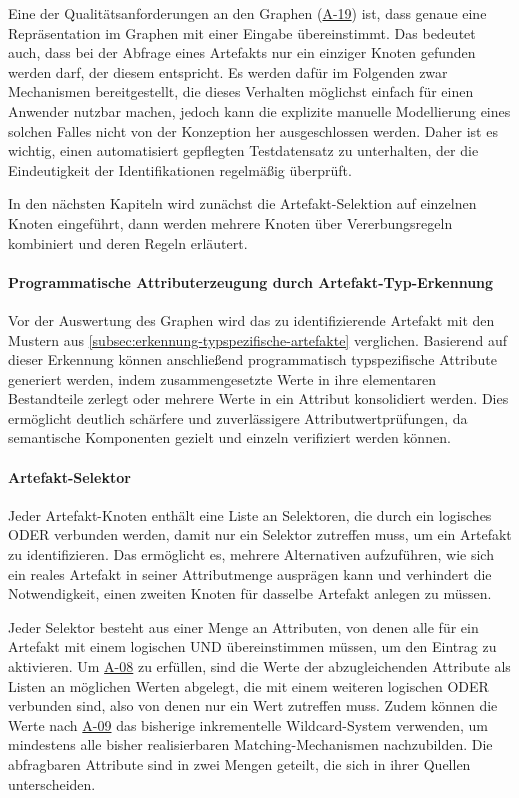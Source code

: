 Eine der Qualitätsanforderungen an den Graphen (\hyperref[subsec:req-graph-inner-consistency]{A-19}) ist, dass genaue eine Repräsentation im Graphen mit einer Eingabe übereinstimmt.
Das bedeutet auch, dass bei der Abfrage eines Artefakts nur ein einziger Knoten gefunden werden darf, der diesem entspricht.
Es werden dafür im Folgenden zwar Mechanismen bereitgestellt, die dieses Verhalten möglichst einfach für einen Anwender nutzbar machen, jedoch kann die explizite manuelle Modellierung eines solchen Falles nicht von der Konzeption her ausgeschlossen werden.
Daher ist es wichtig, einen automatisiert gepflegten Testdatensatz zu unterhalten, der die Eindeutigkeit der Identifikationen regelmäßig überprüft.

In den nächsten Kapiteln wird zunächst die Artefakt-Selektion auf einzelnen Knoten eingeführt, dann werden mehrere Knoten über Vererbungsregeln kombiniert und deren Regeln erläutert.

\paragraph{Programmatische Attributerzeugung durch Artefakt-Typ-Erkennung}

Vor der Auswertung des Graphen wird das zu identifizierende Artefakt mit den Mustern aus \autoref{subsec:erkennung-typspezifische-artefakte} verglichen.
Basierend auf dieser Erkennung können anschließend programmatisch typspezifische Attribute generiert werden, indem zusammengesetzte Werte in ihre elementaren Bestandteile zerlegt oder mehrere Werte in ein Attribut konsolidiert werden.
Dies ermöglicht deutlich schärfere und zuverlässigere Attributwertprüfungen, da semantische Komponenten gezielt und einzeln verifiziert werden können.

\paragraph{Artefakt-Selektor}

Jeder Artefakt-Knoten enthält eine Liste an Selektoren, die durch ein logisches ODER verbunden werden, damit nur ein Selektor zutreffen muss, um ein Artefakt zu identifizieren.
Das ermöglicht es, mehrere Alternativen aufzuführen, wie sich ein reales Artefakt in seiner Attributmenge ausprägen kann und verhindert die Notwendigkeit, einen zweiten Knoten für dasselbe Artefakt anlegen zu müssen.

Jeder Selektor besteht aus einer Menge an Attributen, von denen alle für ein Artefakt mit einem logischen UND übereinstimmen müssen, um den Eintrag zu aktivieren.
Um \hyperref[subsec:req-multiple-attribute-values]{A-08} zu erfüllen, sind die Werte der abzugleichenden Attribute als Listen an möglichen Werten abgelegt, die mit einem weiteren logischen ODER verbunden sind, also von denen nur ein Wert zutreffen muss.
Zudem können die Werte nach \hyperref[subsec:req-regex-support]{A-09} das bisherige inkrementelle Wildcard-System verwenden, um mindestens alle bisher realisierbaren Matching-Mechanismen nachzubilden.
Die abfragbaren Attribute sind in zwei Mengen geteilt, die sich in ihrer Quellen unterscheiden.

